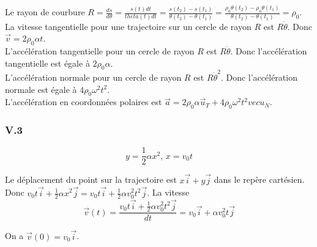 \documentclass[]{book}
\theoremstyle{definition}
\begin{document}
Le rayon de courbure $R = \frac{ds}{d\theta} = \frac{s(t)dt}{theta(t)dt} = \frac{s(t_2)-s(t_1)}{\theta(t_2)-\theta(t_1)} = \frac{\rho_0\theta(t_2)-\rho_0\theta(t_1)}{\theta(t_2)-\theta(t_1)} = \rho_{0}$.\\

La vitesse tangentielle pour une trajectoire sur un cercle de rayon $R$ est $R\dot{\theta}$. Donc $\vec{v}=2\rho_0\alpha t$.\\

L'acc\'el\'eration tangentielle pour un cercle de rayon $R$ est $R\ddot{\theta}$. Donc l'acc\'el\'eration tangentielle est \'egale \`a $2\rho_{0}\alpha$.\\

L'acc\'el\'eration normale pour un cercle de rayon $R$ est $R\dot{\theta}^2$. Donc l'acc\'el\'eration normale est \'egale \`a $4\rho_{0}\omega^2t^2$.\\

L'acc\'el\'eration en coordonn\'ees polaires est $\vec{a} = 2\rho_{0}\alpha\vec{u}_{T} +  4\rho_{0}\omega^2t^2vec{u}_{N}$.

\subsubsection*{V.3}
$$y = \frac{1}{2}\alpha x^2,\, x=v_0 t$$


Le d\'eplacement du point sur la trajectoire est $x\vec{i}+y\vec{j}$ dans le rep\`ere cart\'esien. Donc $v_0 t \vec{i} + \frac{1}{2}\alpha x^2 \vec{j} = v_0 t \vec{i} + \frac{1}{2}\alpha v_0^2 t^2 \vec{j}$. La vitesse 
$$\vec{v}(t) = \frac{v_0 t \vec{i} + \frac{1}{2}\alpha v_0^2 t^2 \vec{j}}{dt} = v_0 \vec{i} + \alpha v_0^2 t \vec{j}$$

On a $\vec{v}(0) = v_0 \vec{i}$.\\
\end{document}
